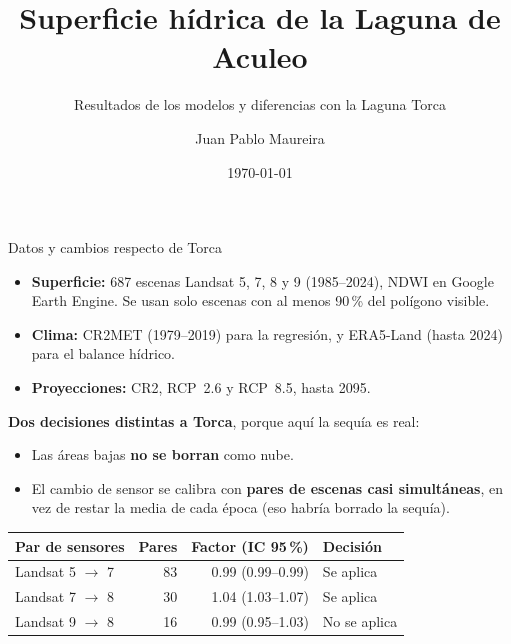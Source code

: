 \documentclass[10pt]{beamer}
\title[Laguna de Aculeo: resultados]{Superficie hídrica de la Laguna de Aculeo}
\subtitle{Resultados de los modelos y diferencias con la Laguna Torca}
\author[J. P. Maureira]{Juan Pablo Maureira}
\institute[UTalca]{Magíster en Data Science\\Universidad de Talca}
\date{\today}
\begin{document}
\begin{frame}
\titlepage
\end{frame}

\begin{frame}{Datos y cambios respecto de Torca}
\begin{itemize}
\item \textbf{Superficie:} 687 escenas Landsat 5, 7, 8 y 9 (1985--2024), NDWI en Google Earth Engine. Se usan solo escenas con al menos 90\,\% del polígono visible.
\item \textbf{Clima:} CR2MET (1979--2019) para la regresión, y ERA5-Land (hasta 2024) para el balance hídrico.
\item \textbf{Proyecciones:} CR2, RCP~2.6 y RCP~8.5, hasta 2095.
\end{itemize}
\vspace{2mm}
\textbf{Dos decisiones distintas a Torca}, porque aquí la sequía es real:
\begin{itemize}
\item Las áreas bajas \textbf{no se borran} como nube.
\item El cambio de sensor se calibra con \textbf{pares de escenas casi simultáneas}, en vez de restar la media de cada época (eso habría borrado la sequía).
\end{itemize}
\vspace{2mm}
\centering
\small
\begin{tabular}{lrrl}
\toprule
Par de sensores & Pares & Factor (IC 95\,\%) & Decisión \\
\midrule
Landsat 5 $\to$ 7 & 83 & 0.99 (0.99--0.99) & Se aplica \\
Landsat 7 $\to$ 8 & 30 & 1.04 (1.03--1.07) & Se aplica \\
Landsat 9 $\to$ 8 & 16 & 0.99 (0.95--1.03) & No se aplica \\
\bottomrule
\end{tabular}
\end{frame}
\end{document}
